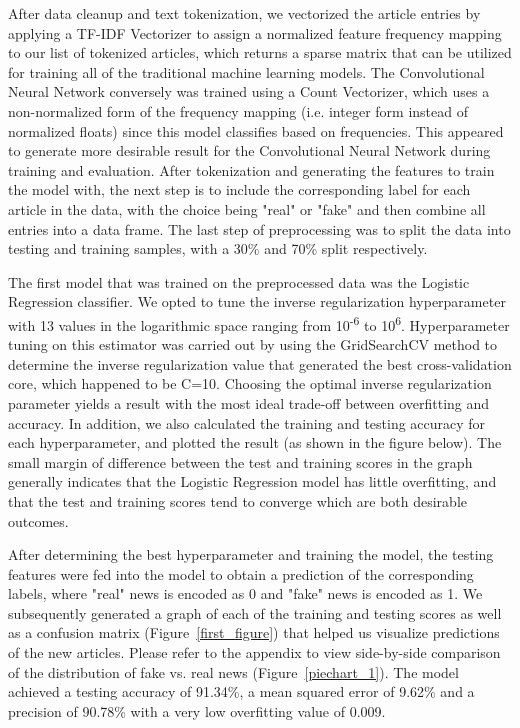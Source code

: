 \documentclass[10pt,twocolumn,letterpaper]{article}
\begin{document}
After data cleanup and text tokenization, we vectorized the article entries by applying a TF-IDF Vectorizer to assign a normalized feature frequency mapping to our list of tokenized articles, which returns a sparse matrix that can be utilized for training all of the traditional machine learning models. The Convolutional Neural Network conversely was trained using a Count Vectorizer, which uses a non-normalized form of the frequency mapping (i.e. integer form instead of normalized floats) since this model classifies based on frequencies. This appeared to generate more desirable result for the Convolutional Neural Network during training and evaluation. After tokenization and generating the features to train the model with, the next step is to include the corresponding label for each article in the data, with the choice being "real" or "fake" and then combine all entries into a data frame. The last step of preprocessing was to split the data into testing and training samples, with a 30\% and 70\% split respectively.\par

The first model that was trained on the preprocessed data was the Logistic Regression classifier. We opted to tune the inverse regularization hyperparameter with 13 values in the logarithmic space ranging from 10\textsuperscript{-6} to 10\textsuperscript{6}. Hyperparameter tuning on this estimator was carried out by using the GridSearchCV method to determine the inverse regularization value that generated the best cross-validation core, which happened to be C=10. Choosing the optimal inverse regularization parameter yields a result with the most ideal trade-off between overfitting and accuracy.  In addition, we also calculated the training and testing accuracy for each hyperparameter, and plotted the result (as shown in the figure below). The small margin of difference between the test and training scores in the graph generally indicates that the Logistic Regression model has little overfitting, and that the test and training scores tend to converge which are both desirable outcomes.\par

After determining the best hyperparameter and training the model, the testing features were fed into the model to obtain a prediction of the corresponding labels, where "real" news is encoded as 0 and "fake" news is encoded as 1. We subsequently generated a graph of each of the training and testing scores as well as a confusion matrix (Figure~\ref{first_figure}) that helped us visualize predictions of the new articles. Please refer to the appendix to view side-by-side comparison of the distribution of fake vs. real news (Figure~\ref{piechart_1}). The model achieved a testing accuracy of 91.34\%, a mean squared error of 9.62\% and a precision of 90.78\% with a very low overfitting value of 0.009. \\
\end{document}
